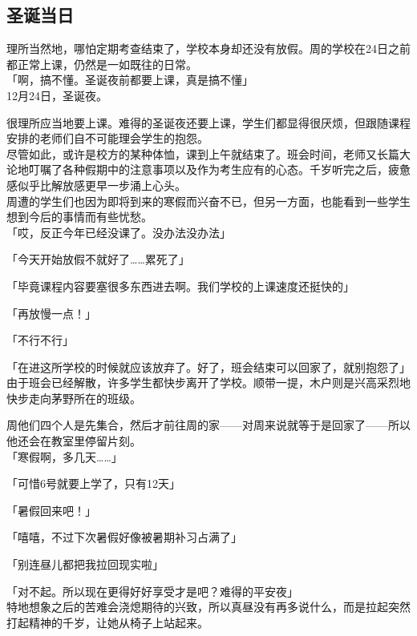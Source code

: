 \subsection{圣诞当日}

理所当然地，哪怕定期考查结束了，学校本身却还没有放假。周的学校在24日之前都正常上课，仍然是一如既往的日常。\\

「啊，搞不懂。圣诞夜前都要上课，真是搞不懂」\\

12月24日，圣诞夜。

很理所应当地要上课。难得的圣诞夜还要上课，学生们都显得很厌烦，但跟随课程安排的老师们自不可能理会学生的抱怨。\\

尽管如此，或许是校方的某种体恤，课到上午就结束了。班会时间，老师又长篇大论地叮嘱了各种假期中的注意事项以及作为考生应有的心态。千岁听完之后，疲惫感似乎比解放感更早一步涌上心头。\\

周遭的学生们也因为即将到来的寒假而兴奋不已，但另一方面，也能看到一些学生想到今后的事情而有些忧愁。\\

「哎，反正今年已经没课了。没办法没办法」

「今天开始放假不就好了……累死了」

「毕竟课程内容要塞很多东西进去啊。我们学校的上课速度还挺快的」

「再放慢一点！」

「不行不行」

「在进这所学校的时候就应该放弃了。好了，班会结束可以回家了，就别抱怨了」\\

由于班会已经解散，许多学生都快步离开了学校。顺带一提，木户则是兴高采烈地快步走向茅野所在的班级。

周他们四个人是先集合，然后才前往周的家——对周来说就等于是回家了——所以他还会在教室里停留片刻。\\

「寒假啊，多几天……」

「可惜6号就要上学了，只有12天」

「暑假回来吧！」

「嘻嘻，不过下次暑假好像被暑期补习占满了」

「别连昼儿都把我拉回现实啦」

「对不起。所以现在更得好好享受才是吧？难得的平安夜」\\

特地想象之后的苦难会浇熄期待的兴致，所以真昼没有再多说什么，而是拉起突然打起精神的千岁，让她从椅子上站起来。\\

